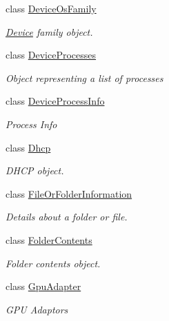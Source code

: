 \begin{DoxyCompactItemize}
class \hyperlink{class_microsoft_1_1_tools_1_1_windows_device_portal_1_1_device_portal_1_1_device_os_family}{Device\+Os\+Family}
\begin{DoxyCompactList}\small\item\em \hyperlink{class_microsoft_1_1_tools_1_1_windows_device_portal_1_1_device_portal_1_1_device}{Device} family object. \end{DoxyCompactList}\item 
class \hyperlink{class_microsoft_1_1_tools_1_1_windows_device_portal_1_1_device_portal_1_1_device_processes}{Device\+Processes}
\begin{DoxyCompactList}\small\item\em Object representing a list of processes \end{DoxyCompactList}\item 
class \hyperlink{class_microsoft_1_1_tools_1_1_windows_device_portal_1_1_device_portal_1_1_device_process_info}{Device\+Process\+Info}
\begin{DoxyCompactList}\small\item\em Process Info \end{DoxyCompactList}\item 
class \hyperlink{class_microsoft_1_1_tools_1_1_windows_device_portal_1_1_device_portal_1_1_dhcp}{Dhcp}
\begin{DoxyCompactList}\small\item\em D\+H\+CP object. \end{DoxyCompactList}\item 
class \hyperlink{class_microsoft_1_1_tools_1_1_windows_device_portal_1_1_device_portal_1_1_file_or_folder_information}{File\+Or\+Folder\+Information}
\begin{DoxyCompactList}\small\item\em Details about a folder or file. \end{DoxyCompactList}\item 
class \hyperlink{class_microsoft_1_1_tools_1_1_windows_device_portal_1_1_device_portal_1_1_folder_contents}{Folder\+Contents}
\begin{DoxyCompactList}\small\item\em Folder contents object. \end{DoxyCompactList}\item 
class \hyperlink{class_microsoft_1_1_tools_1_1_windows_device_portal_1_1_device_portal_1_1_gpu_adapter}{Gpu\+Adapter}
\begin{DoxyCompactList}\small\item\em G\+PU Adaptors \end{DoxyCompactList}\item 

\end{DoxyCompactItemize}
